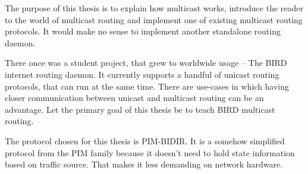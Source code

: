 The purpose of this thesis is to explain how multicast works, introduce the reader to the world of multicast routing and implement one of existing multicast routing
protocols. It would make no sense to implement another standalone routing
daemon.

There once was a student project, that grew to worldwide usage -- The BIRD
internet routing daemon. It currently supports a handful of unicast routing
protocols, that can run at the same time. There are use-cases in which having closer communication
between unicast and multicast routing can be an advantage. Let the primary goal of
this thesis be to teach BIRD multicast routing.

The protocol chosen for this thesis is PIM-BIDIR. It is a somehow simplified
protocol from the PIM family because it doesn't need to hold state information
based on traffic source. That makes it less demanding on network hardware.
